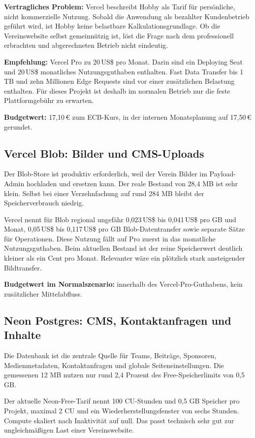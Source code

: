 \documentclass[11pt,a4paper]{article}
\newcommand{\eur}[1]{#1\,€}
\newcommand{\usd}[1]{#1\,US\$}
\begin{document}
\textbf{Vertragliches Problem:} Vercel beschreibt Hobby als Tarif für persönliche, nicht kommerzielle Nutzung. Sobald die Anwendung als bezahlter Kundenbetrieb geführt wird, ist Hobby keine belastbare Kalkulationsgrundlage. Ob die Vereinswebsite selbst gemeinnützig ist, löst die Frage nach dem professionell erbrachten und abgerechneten Betrieb nicht eindeutig.

\textbf{Empfehlung:} Vercel Pro zu \usd{20} pro Monat. Darin sind ein Deploying Seat und \usd{20} monatliches Nutzungsguthaben enthalten. Fast Data Transfer bis 1 TB und zehn Millionen Edge Requests sind vor einer zusätzlichen Belastung enthalten. Für dieses Projekt ist deshalb im normalen Betrieb nur die feste Plattformgebühr zu erwarten.

\textbf{Budgetwert:} \eur{17,10} zum ECB-Kurs, in der internen Monatsplanung auf \eur{17,50} gerundet.

\subsection{Vercel Blob: Bilder und CMS-Uploads}

Der Blob-Store ist produktiv erforderlich, weil der Verein Bilder im Payload-Admin hochladen und ersetzen kann. Der reale Bestand von 28,4 MB ist sehr klein. Selbst bei einer Verzehnfachung auf rund 284 MB bleibt der Speicherverbrauch niedrig.

Vercel nennt für Blob regional ungefähr \usd{0,023} bis \usd{0,041} pro GB und Monat, \usd{0,05} bis \usd{0,117} pro GB Blob-Datentransfer sowie separate Sätze für Operationen. Diese Nutzung fällt auf Pro zuerst in das monatliche Nutzungsguthaben. Beim aktuellen Bestand ist der reine Speicherwert deutlich kleiner als ein Cent pro Monat. Relevanter wäre ein plötzlich stark ansteigender Bildtransfer.

\textbf{Budgetwert im Normalszenario:} innerhalb des Vercel-Pro-Guthabens, kein zusätzlicher Mittelabfluss.

\subsection{Neon Postgres: CMS, Kontaktanfragen und Inhalte}

Die Datenbank ist die zentrale Quelle für Teams, Beiträge, Sponsoren, Medienmetadaten, Kontaktanfragen und globale Seiteneinstellungen. Die gemessenen 12 MB nutzen nur rund 2,4 Prozent des Free-Speicherlimits von 0,5 GB.

Der aktuelle Neon-Free-Tarif nennt 100 CU-Stunden und 0,5 GB Speicher pro Projekt, maximal 2 CU und ein Wiederherstellungsfenster von sechs Stunden. Compute skaliert nach Inaktivität auf null. Das passt technisch sehr gut zur ungleichmäßigen Last einer Vereinswebsite.
\end{document}
